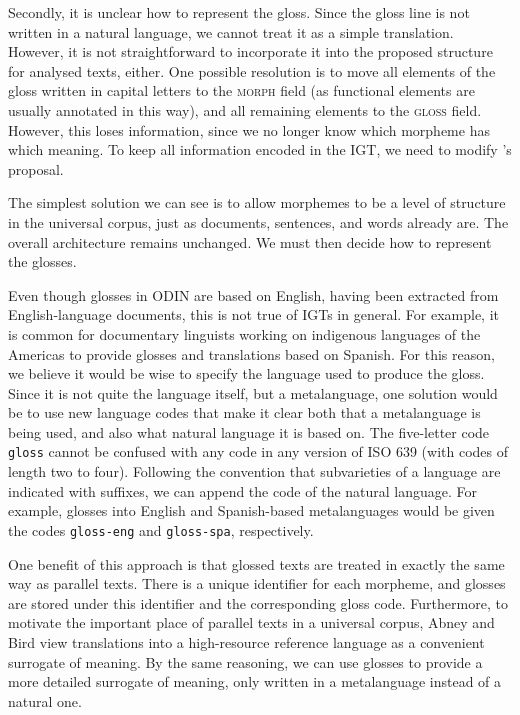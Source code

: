 Secondly, it is unclear how to represent the gloss.  Since the gloss line is not written in a natural language, we cannot treat it as a simple translation.  However, it is not straightforward to incorporate it into the proposed structure for analysed texts, either.  
One possible resolution is to move all elements of the gloss written in capital letters to the \textsc{morph} field (as functional elements are usually annotated in this way), and all remaining elements to the \textsc{gloss} field.  However, this loses information, since we no longer know which morpheme has which meaning.  To keep all information encoded in the IGT, we need to modify 's proposal.

The simplest solution we can see is to allow morphemes to be a level of structure in the universal corpus, just as documents, sentences, and words already are.  The overall architecture remains unchanged.  We must then decide how to represent the glosses.

Even though glosses in ODIN are based on English, having been extracted from English-language documents, this is not true of IGTs in general.  For example, it is common for documentary linguists working on indigenous languages of the Americas to provide glosses and translations based on Spanish.  For this reason, we believe it would be wise to specify the language used to produce the gloss.  Since it is not quite the language itself, but a metalanguage, one solution
would be to use new language codes that make it clear both that a metalanguage is being used, and also what natural language it is based on.  The five-letter code \texttt{gloss} cannot be confused with any code in any version of ISO 639 (with codes of length two to four).  Following the convention that subvarieties of a language are indicated with suffixes, we can append the code of the natural language.  For example, glosses into English and Spanish-based metalanguages would be given the codes \texttt{gloss-eng} and \texttt{gloss-spa}, respectively.

One benefit of this approach is that glossed texts are treated in exactly the same way as parallel texts.  There is a unique identifier for each morpheme, and glosses are stored under this identifier and the corresponding gloss code.  Furthermore, to motivate the important place of parallel texts in a universal corpus, Abney and Bird view translations into a high-resource reference language as a convenient surrogate of meaning. By the same reasoning, we can use glosses to provide a more detailed surrogate of meaning, only written in a metalanguage instead of a natural one.




